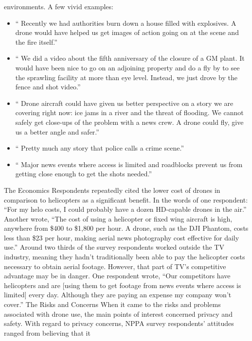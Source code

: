 environments. A few vivid examples:
\begin{itemize}
\item `` Recently we had authorities burn down a house filled with
explosives. A drone would have helped us get images of action
going on at the scene and the fire itself.''
\item `` We did a video about the fifth anniversary of the closure of a
GM plant. It would have been nice to go on an adjoining property
and do a fly by to see the sprawling facility at more than eye
level. Instead, we just drove by the fence and shot video.''
\item `` Drone aircraft could have given us better perspective on a story
we are covering right now: ice jams in a river and the threat of
flooding. We cannot safely get close-ups of the problem with a
news crew. A drone could fly, give us a better angle and safer.''
\item `` Pretty much any story that police calls a crime scene.''
\item `` Major news events where access is limited and roadblocks prevent
us from getting close enough to get the shots needed.''
\end{itemize}

The Economics
Respondents repeatedly cited the lower cost of drones in comparison to
helicopters as a significant benefit. In the words of one respondent: ``For
my helo costs, I could probably have a dozen HD-capable drones in the air.''
Another wrote, ``The cost of using a helicopter or fixed wing aircraft is high,
anywhere from \$400 to \$1,800 per hour. A drone, such as the DJI Phantom,
costs less than \$23 per hour, making aerial news photography cost effective
for daily use.''
Around two thirds of the survey respondents worked outside the TV industry,
meaning they hadn't traditionally been able to pay the helicopter costs
necessary to obtain aerial footage. However, that part of TV's competitive
advantage may be in danger. One respondent wrote, ``Our competitors have
helicopters and are [using them to get footage from news events where
access is limited] every day. Although they are paying an expense my company
won't cover.''
The Risks and Concerns
When it came to the risks and problems associated with drone use, the
main points of interest concerned privacy and safety. With regard to privacy
concerns, NPPA survey respondents' attitudes ranged from believing that it


